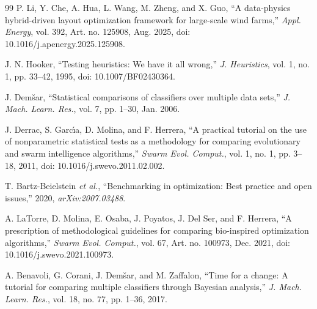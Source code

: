 \begin{thebibliography}{99}
P. Li, Y. Che, A. Hua, L. Wang, M. Zheng, and X. Guo, ``A data-physics hybrid-driven layout optimization framework for large-scale wind farms,'' \textit{Appl. Energy}, vol. 392, Art. no. 125908, Aug. 2025, doi: 10.1016/j.apenergy.2025.125908.

J. N. Hooker, ``Testing heuristics: We have it all wrong,'' \textit{J. Heuristics}, vol. 1, no. 1, pp. 33--42, 1995, doi: 10.1007/BF02430364.

J. Dem\v{s}ar, ``Statistical comparisons of classifiers over multiple data sets,'' \textit{J. Mach. Learn. Res.}, vol. 7, pp. 1--30, Jan. 2006.

J. Derrac, S. Garc\'{\i}a, D. Molina, and F. Herrera, ``A practical tutorial on the use of nonparametric statistical tests as a methodology for comparing evolutionary and swarm intelligence algorithms,'' \textit{Swarm Evol. Comput.}, vol. 1, no. 1, pp. 3--18, 2011, doi: 10.1016/j.swevo.2011.02.002.

T. Bartz-Beielstein \textit{et al.}, ``Benchmarking in optimization: Best practice and open issues,'' 2020, \textit{arXiv:2007.03488}.

A. LaTorre, D. Molina, E. Osaba, J. Poyatos, J. Del Ser, and F. Herrera, ``A prescription of methodological guidelines for comparing bio-inspired optimization algorithms,'' \textit{Swarm Evol. Comput.}, vol. 67, Art. no. 100973, Dec. 2021, doi: 10.1016/j.swevo.2021.100973.

A. Benavoli, G. Corani, J. Dem\v{s}ar, and M. Zaffalon, ``Time for a change: A tutorial for comparing multiple classifiers through Bayesian analysis,'' \textit{J. Mach. Learn. Res.}, vol. 18, no. 77, pp. 1--36, 2017.


\end{thebibliography}
